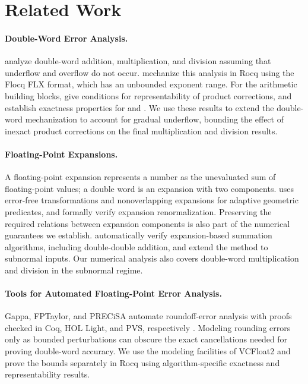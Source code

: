 \section{Related Work}
\label{sec:related-work}

\paragraph{Double-Word Error Analysis.}
\citet{Joldes2017} analyze double-word addition, multiplication,
and division assuming that underflow and overflow do not occur.
\citet{Rideau2022} mechanize this analysis in Rocq using the
Flocq FLX format, which has an unbounded exponent range.
For the arithmetic building blocks, \citet{BoldoDaumas2003}
give conditions for representability of product corrections,
and \citet{Boldo2017} establish exactness properties for
\TwoSum{} and \FastTwoSum{}. We use these results to extend
the double-word mechanization to account for gradual underflow,
bounding the effect of inexact product corrections on the final
multiplication and division results.

\paragraph{Floating-Point Expansions.}
A floating-point expansion represents a number as the unevaluated
sum of floating-point values; a double word is an
expansion with two components. \citet{Shewchuk1997} uses
error-free transformations and nonoverlapping expansions for
adaptive geometric predicates, and \citet{Boldo2017Renorm}
formally verify expansion renormalization. Preserving the
required relations between expansion components is also part
of the numerical guarantees we establish.
\citet{Zhang2025} automatically verify expansion-based summation
algorithms, including double-double addition, and extend the
method to subnormal inputs. Our numerical analysis also covers
double-word multiplication and division in the subnormal regime.

\paragraph{Tools for Automated Floating-Point Error Analysis.}
Gappa, FPTaylor, and PRECiSA automate roundoff-error analysis
with proofs checked in Coq, HOL Light, and PVS, respectively
\citep{deDinechin2011,Solovyev2015,Titolo2024PRECiSA}.
Modeling rounding errors only as bounded perturbations can
obscure the exact cancellations needed for proving double-word
accuracy. We use the modeling facilities of VCFloat2
\citep{AppelKellison2024} and prove the bounds separately in
Rocq using algorithm-specific exactness and representability
results.

